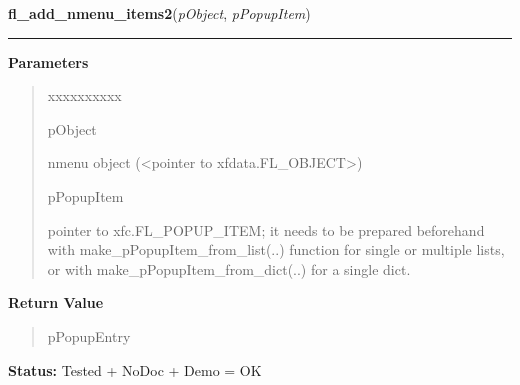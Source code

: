 \hspace{.8\funcindent}\begin{boxedminipage}{\funcwidth}

    \raggedright \textbf{fl\_add\_nmenu\_items2}(\textit{pObject}, \textit{pPopupItem})

    \vspace{-1.5ex}

    \rule{\textwidth}{0.5\fboxrule}
\setlength{\parskip}{2ex}
\setlength{\parskip}{1ex}
      \textbf{Parameters}
      \vspace{-1ex}

      \begin{quote}
        \begin{Ventry}{xxxxxxxxxx}

          \item[pObject]

          nmenu object ({\textless}pointer to 
          xfdata.FL\_OBJECT{\textgreater})

          \item[pPopupItem]

          pointer to xfc.FL\_POPUP\_ITEM; it needs to be prepared 
          beforehand with make\_pPopupItem\_from\_list(..) function for 
          single or multiple lists, or with 
          make\_pPopupItem\_from\_dict(..) for a single dict.

        \end{Ventry}

      \end{quote}

      \textbf{Return Value}
    \vspace{-1ex}

      \begin{quote}
      pPopupEntry

      \end{quote}

\textbf{Status:} Tested + NoDoc + Demo = OK



    \end{boxedminipage}

    \label{xformslib:library:fl_insert_nmenu_items2}

    \vspace{0.5ex}

